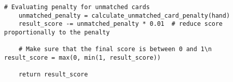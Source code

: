 \begin{tcolorbox}[
breakable,
title=Gameplay AI policy component in code,  
colframe=gray, 
colback=white,
]
\begin{lstlisting}[]
    # Evaluating penalty for unmatched cards
    unmatched_penalty = calculate_unmatched_card_penalty(hand)
    result_score -= unmatched_penalty * 0.01  # reduce score proportionally to the penalty

    # Make sure that the final score is between 0 and 1\n    result_score = max(0, min(1, result_score))

    return result_score
\end{lstlisting}
\end{tcolorbox}